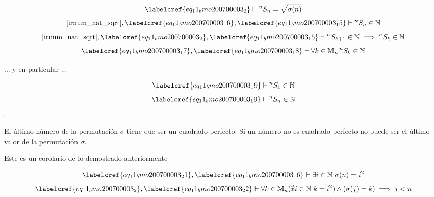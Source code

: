 \begin{equation} \label{eq_11_bmo200700003_16}
	\labelcref{eq_11_bmo200700003_2} \vdash \prescript{n}{}{S_n} = \sqrt{\sigma(n)}
\end{equation}
\begin{equation} \label{eq_11_bmo200700003_17}
	\cref{irnum_nat_sqrt}, \labelcref{eq_11_bmo200700003_16}, \labelcref{eq_11_bmo200700003_15} \vdash \prescript{n}{}{S_n} \in \mathbb{N}
\end{equation}
\begin{equation} \label{eq_11_bmo200700003_18}
	\cref{irnum_nat_sqrt}, \labelcref{eq_11_bmo200700003_2}, \labelcref{eq_11_bmo200700003_15} \vdash \prescript{n}{}{S_{k+1}} \in \mathbb{N} \implies \prescript{n}{}{S_{k}} \in \mathbb{N}
\end{equation}
\begin{equation} \label{eq_11_bmo200700003_19}
	\labelcref{eq_11_bmo200700003_17}, \labelcref{eq_11_bmo200700003_18} \vdash \forall k \in \mathbb{M}_n \prescript{n}{}{S_{k}} \in \mathbb{N}
\end{equation}

... y en particular ...

\begin{equation} \label{eq_11_bmo200700003_20}
	\labelcref{eq_11_bmo200700003_19} \vdash \prescript{n}{}{S_{1}} \in \mathbb{N}
\end{equation}
\begin{equation} \label{eq_11_bmo200700003_21}
	\labelcref{eq_11_bmo200700003_19} \vdash \prescript{n}{}{S_{n}} \in \mathbb{N}
\end{equation}
\hfill $\square$

\begin{claim}
	El último número de la permutación $\sigma$ tiene que ser un cuadrado perfecto. Si un número no es cuadrado perfecto no puede ser el último valor de la permutación $\sigma$.
\end{claim}

Este es un corolario de lo demostrado anteriormente

\begin{equation} \label{eq_11_bmo200700003_22}
	\labelcref{eq_11_bmo200700003_21}, \labelcref{eq_11_bmo200700003_16} \vdash \exists i \in \mathbb{N}\ \sigma(n) = i^2
\end{equation}
\begin{equation} \label{eq_11_bmo200700003_23}
	\labelcref{eq_11_bmo200700003_2}, \labelcref{eq_11_bmo200700003_22} \vdash \forall k \in \mathbb{M}_n (\nexists i \in \mathbb{N}\ k = i^2) \land (\sigma(j) = k) \implies j < n
\end{equation}


